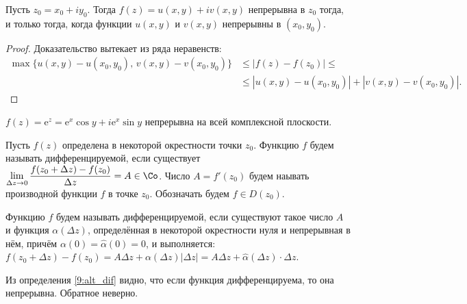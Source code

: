 \begin{statement}
Пусть \(z_0 = x_0 + iy_0\). Тогда \(f(z) = u(x, y) +iv(x,y)\) непрерывна в \(z_0\) тогда, и только
тогда, когда функции \(u(x, y)\) и \(v(x, y)\) непрерывны в \((x_0, y_0)\).
\end{statement}

\begin{proof}
Доказательство вытекает из ряда неравенств:
\begin{align}
    \max \{u(x,y) - u(x_0, y_0), \, v(x,y) - v(x_0, y_0)\}
    &\le |f(z) - f(z_0)| \le\\
    &\le |u(x,y) - u(x_0, y_0)| + |v(x,y) - v(x_0, y_0)|.
\end{align}
\end{proof}

\begin{example}
\(f(z) = \text{e}^z = \text{e}^x\cos{y} + i\text{e}^x\sin{y}\) непрерывна на всей комплексной
плоскости.
\end{example}



\begin{definition}
Пусть \(f(z)\) определена в некоторой окрестности точки \(z_0\). Функцию \(f\) будем называть
дифференцируемой, если существует \(\lim\limits_{\Delta z \to 0}
\dfrac{f(z_0 + \Delta z) - f(z_0)}{\Delta z} = A \in \Co\). Число \(A = f'(z_0)\) будем наывать
производной функции \(f\) в точке \(z_0\). Обозначать будем \(f \in D(z_0)\).
\end{definition}

\begin{definition}\label{9:alt_dif}
    Функцию \(f\) будем называть дифференцируемой, если существуют такое число \(A\)
    и функция \(\alpha(\Delta z)\), определённая в некоторой окрестности нуля и непрерывная в нём,
    причём \(\alpha (0) = \hat{\alpha} (0) = 0\), и выполняется: \(f(z_0 + \Delta z) - f(z_0)
    = A\Delta z + \alpha (\Delta z) |\Delta z| = A\Delta z + \hat{\alpha}(\Delta z) \cdot
    \Delta z\).
\end{definition}

\begin{note}
Из определения \ref{9:alt_dif} видно, что если функция дифференцируема, то она непрерывна. Обратное
неверно.
\end{note}

